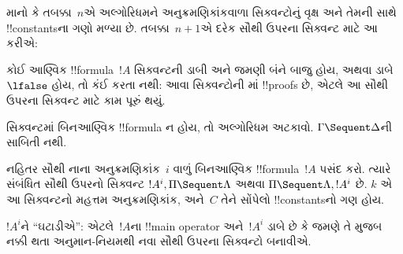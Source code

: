 \documentclass[../../../include/open-logic-section]{subfiles}
\begin{document}
માનો કે
તબક્કા~$n$એ
અલ્ગોરિધમને
અનુક્રમણિકાંકવાળા
સિક્વન્ટોનું
વૃક્ષ અને
તેમની સાથે
!!{constant}sના
ગણો મળ્યા
છે. તબક્કા~$n+1$એ
દરેક સૌથી
ઉપરના સિક્વન્ટ
માટે આ
કરીએ:

કોઈ આણ્વિક !!{formula}~$!A$
સિક્વન્ટની
ડાબી અને
જમણી બંને
બાજુ હોય,
અથવા ડાબે
$\lfalse$
હોય, તો
કંઈ કરતા
નથી: આવા
સિક્વન્ટોની
માં
!!{proof}s
છે, એટલે
આ સૌથી
ઉપરના સિક્વન્ટ
માટે કામ
પૂરું થયું.

સિક્વન્ટમાં
બિનઆણ્વિક
!!{formula}
ન હોય,
તો અલ્ગોરિધમ
અટકાવો.
$\Gamma \Sequent \Delta$ની
સાબિતી નથી.

નહિતર સૌથી
નાના
અનુક્રમણિકાંક~$i$
વાળું
બિનઆણ્વિક
!!{formula}~$!A$
પસંદ કરો.
ત્યારે સંબંધિત
સૌથી ઉપરનો
સિક્વન્ટ
$!A^i, \Pi
\Sequent \Lambda$
અથવા
$\Pi \Sequent \Lambda, !A^i$
છે.
$k$ એ
આ સિક્વન્ટનો મહત્તમ અનુક્રમણિકાંક,
અને~$C$
તેને સોંપેલો
!!{constant}sનો
ગણ હોય.

$!A^i$ને
``ઘટાડીએ'':
એટલે~$!A$ના
!!{main operator}
અને~$!A^i$
ડાબે છે
કે જમણે
તે મુજબ
નક્કી થતા
અનુમાન-નિયમથી
નવા સૌથી
ઉપરના સિક્વન્ટો
બનાવીએ.
\end{document}
